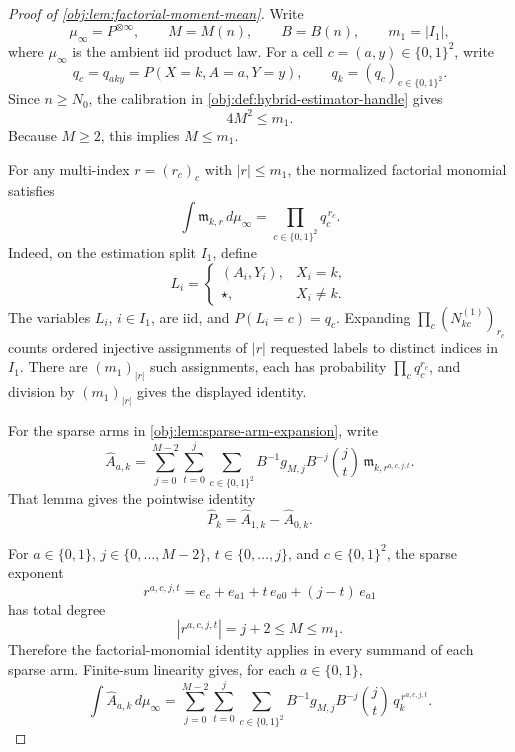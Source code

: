 \begin{proof}[Proof of \cref{obj:lem:factorial-moment-mean}]
Write
\[
\mu_\infty=P^{\otimes\infty},\qquad
M=M(n),\qquad B=B(n),\qquad m_1=|I_1|,
\]
where \(\mu_\infty\) is the ambient iid product law.  For a cell
\(c=(a,y)\in\{0,1\}^2\), write
\[
q_c=q_{aky}=P(X=k,A=a,Y=y),
\qquad
q_k=(q_c)_{c\in\{0,1\}^2}.
\]
Since \(n\ge N_0\), the calibration in \cref{obj:def:hybrid-estimator-handle} gives
\[
4M^2\le m_1 .
\]
Because \(M\ge2\), this implies \(M\le m_1\).

For any multi-index \(r=(r_c)_c\) with \(|r|\le m_1\), the normalized factorial monomial satisfies
\[
\int
\mathfrak m_{k,r}\,d\mu_\infty
=
\prod_{c\in\{0,1\}^2} q_c^{\,r_c}.
\]
Indeed, on the estimation split \(I_1\), define
\[
L_i=
\begin{cases}
(A_i,Y_i),& X_i=k,\\
\star,& X_i\ne k .
\end{cases}
\]
The variables \(L_i\), \(i\in I_1\), are iid, and \(P(L_i=c)=q_c\).  Expanding
\(\prod_c (N^{(1)}_{kc})_{r_c}\) counts ordered injective assignments of \(|r|\) requested labels to distinct indices in \(I_1\).  There are \((m_1)_{|r|}\) such assignments, each has probability \(\prod_c q_c^{r_c}\), and division by \((m_1)_{|r|}\) gives the displayed identity.

For the sparse arms in \cref{obj:lem:sparse-arm-expansion}, write
\[
\widehat A_{a,k}
=
\sum_{j=0}^{M-2}\sum_{t=0}^{j}\sum_{c\in\{0,1\}^2}
B^{-1}g_{M,j}B^{-j}\binom jt\,
\mathfrak m_{k,r^{a,c,j,t}} .
\]
That lemma gives the pointwise identity
\[
\widehat P_k=\widehat A_{1,k}-\widehat A_{0,k}.
\]

For \(a\in\{0,1\}\), \(j\in\{0,\ldots,M-2\}\), \(t\in\{0,\ldots,j\}\), and \(c\in\{0,1\}^2\), the sparse exponent
\[
r^{a,c,j,t}
=
e_c+e_{a1}+t\,e_{a0}+(j-t)\,e_{a1}
\]
has total degree
\[
|r^{a,c,j,t}|=j+2\le M\le m_1 .
\]
Therefore the factorial-monomial identity applies in every summand of each sparse arm.  Finite-sum linearity gives, for each \(a\in\{0,1\}\),
\[
\int \widehat A_{a,k}\,d\mu_\infty
=
\sum_{j=0}^{M-2}\sum_{t=0}^{j}\sum_{c\in\{0,1\}^2}
B^{-1}g_{M,j}B^{-j}\binom jt\,
q_k^{\,r^{a,c,j,t}} .
\]


\end{proof}
